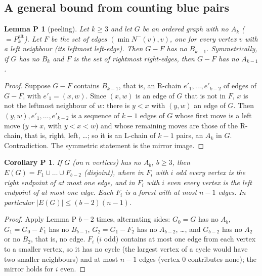 \documentclass[11pt]{article}
\newcommand{\Palt}[1]{P_{#1}^{\mathrm{alt}}}
\theoremstyle{plain}
\newtheorem*{lemmaP}{Lemma P}
\newtheorem*{corP}{Corollary P}
\theoremstyle{remark}
\begin{document}
\subsection{A general bound from counting blue pairs}

\begin{lemmaP}[peeling]
Let $k \geq 3$ and let $G$ be an ordered graph with no $A_k$ ($= \Palt{k}$). Let $F$ be the set of edges
$(\min N^-(v), v)$, one for every vertex $v$ with a left neighbour (its leftmost left-edge). Then $G - F$ has no
$B_{k-1}$. Symmetrically, if $G$ has no $B_k$ and $F$ is the set of rightmost right-edges, then $G - F$ has no
$A_{k-1}$.
\end{lemmaP}

\begin{proof}
Suppose $G - F$ contains $B_{k-1}$, that is, an R-chain $e'_1, \dots, e'_{k-2}$ of edges of $G - F$, with
$e'_1 = (x, w)$. Since $(x, w)$ is an edge of $G$ that is not in $F$, $x$ is not the leftmost neighbour of $w$:
there is $y < x$ with $(y, w)$ an edge of $G$. Then $(y, w), e'_1, \dots, e'_{k-2}$ is a sequence of $k-1$ edges
of $G$ whose first move is a left move ($y \to x$, with $y < x < w$) and whose remaining moves are those of the
R-chain, that is, right, left, \dots; so it is an L-chain of $k-1$ pairs, an $A_k$ in $G$. Contradiction. The
symmetric statement is the mirror image.
\end{proof}

\begin{corP}
If $G$ (on $n$ vertices) has no $A_b$, $b \geq 3$, then $E(G) = F_1 \cup \dots \cup F_{b-2}$ (disjoint), where in
$F_i$ with $i$ odd every vertex is the right endpoint of at most one edge, and in $F_i$ with $i$ even every vertex
is the left endpoint of at most one edge. Each $F_i$ is a forest with at most $n-1$ edges. In particular
$|E(G)| \leq (b-2)(n-1)$.
\end{corP}

\begin{proof}
Apply Lemma P $b-2$ times, alternating sides: $G_0 = G$ has no $A_b$, $G_1 = G_0 - F_1$ has no $B_{b-1}$,
$G_2 = G_1 - F_2$ has no $A_{b-2}$, \dots, and $G_{b-2}$ has no $A_2$ or no $B_2$, that is, no edge. $F_i$ ($i$
odd) contains at most one edge from each vertex to a smaller vertex, so it has no cycle (the largest vertex of a
cycle would have two smaller neighbours) and at most $n-1$ edges (vertex $0$ contributes none); the mirror holds
for $i$ even.
\end{proof}
\end{document}
